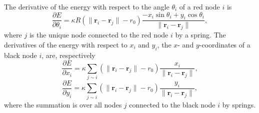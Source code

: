 \documentclass{../kin_math}
\begin{document}
\begin{questions}
  The derivative of the energy with respect to the angle $\theta_i$ of a red node $i$ is
  \begin{equation}
    \frac{\partial E}{\partial \theta_i} = \kappa R(\|\textbf{r}_i - \textbf{r}_j\| - r_0) \frac{-x_i \sin \theta_i + y_i \cos \theta_i}{\|\textbf{r}_i - \textbf{r}_j\|},
  \end{equation}
  where $j$ is the unique node connected to the red node $i$ by a spring. The derivatives of the energy with respect to $x_i$ and $y_i$, the $x$- and $y$-coordinates of a black node $i$, are, respectively
  \begin{equation}
    \frac{\partial E}{\partial x_i} = \kappa \sum_{j \sim i} (\|\textbf{r}_i - \textbf{r}_j\| - r_0) \frac{x_i}{\|\textbf{r}_i - \textbf{r}_j\|},
  \end{equation}
  \begin{equation}
    \frac{\partial E}{\partial y_i} = \kappa \sum_{j \sim i} (\|\textbf{r}_i - \textbf{r}_j\| - r_0) \frac{y_i}{\|\textbf{r}_i - \textbf{r}_j\|},
  \end{equation}
  where the summation is over all nodes $j$ connected to the black node $i$ by springs.


\end{questions}
\end{document}
